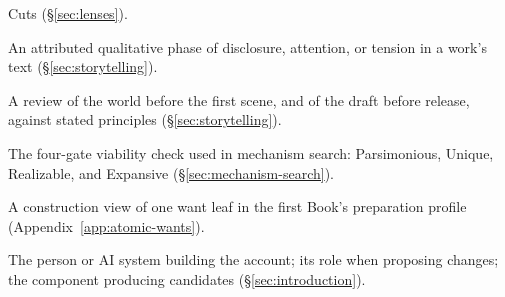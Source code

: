 \documentclass[11pt,a4paper]{article}
\begin{document}
\begin{small}
\begin{description}[leftmargin=0pt,itemsep=1pt,parsep=0pt]
Cuts (\S\ref{sec:lenses}).
\item[Telling phase] An attributed qualitative phase of disclosure, attention,
or tension in a work's text (\S\ref{sec:storytelling}).
\item[Director review] A review of the world before the first scene, and of the
draft before release, against stated principles (\S\ref{sec:storytelling}).
\item[PURE] The four-gate viability check used in mechanism search:
Parsimonious, Unique, Realizable, and Expansive (\S\ref{sec:mechanism-search}).
\item[AtomicWant] A construction view of one want leaf in the first Book's
preparation profile (Appendix~\ref{app:atomic-wants}).
\item[Modeler, constructor, generator] The person or AI system building the
account; its role when proposing changes; the component producing candidates
(\S\ref{sec:introduction}).
\end{description}
\end{small}



\end{document}

